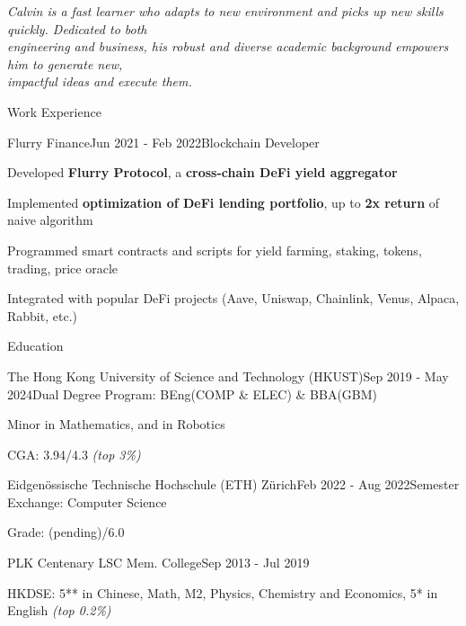 \documentclass{resume}
\begin{document}
\emph{Calvin is a fast learner who adapts to new environment and picks up new skills quickly. Dedicated to both}
\\\emph{engineering and business, his robust and diverse academic background
empowers him to generate new,}
\\\emph{impactful ideas and execute them.}

\begin{rSection}{Work Experience}
    
    \begin{rSubsection}{Flurry Finance}{Jun 2021 - Feb 2022}{Blockchain Developer}{}
        \item Developed \textbf{Flurry Protocol}, a \textbf{cross-chain DeFi yield aggregator}
        \item Implemented \textbf{optimization of DeFi lending portfolio}, up to \textbf{2x return} of naive algorithm
        \item Programmed smart contracts and scripts for yield farming, staking, tokens, trading, price oracle
        \item Integrated with popular DeFi projects (Aave, Uniswap, Chainlink, Venus, Alpaca, Rabbit, etc.)
    \end{rSubsection}
    
\end{rSection}

\begin{rSection}{Education}

    \begin{rSubsection}{The Hong Kong University of Science and Technology (HKUST)}{Sep 2019 - May 2024}{Dual Degree Program: BEng(COMP \& ELEC) \& BBA(GBM)}{}
        \item Minor in Mathematics, and in Robotics
        \item CGA: 3.94/4.3 \emph{(top 3\%)}
    \end{rSubsection}

    \begin{rSubsection}{Eidgenössische Technische Hochschule (ETH) Zürich}{Feb 2022 - Aug 2022}{Semester Exchange: Computer Science}{}
        \item Grade: (pending)/6.0
    \end{rSubsection}

    \begin{rSubsection}{PLK Centenary LSC Mem. College}{Sep 2013 - Jul 2019}{}{}
        \item HKDSE: 5** in Chinese, Math, M2, Physics, Chemistry and Economics, 5* in English \emph{(top 0.2\%)}
    \end{rSubsection}

\end{rSection}
\end{document}
